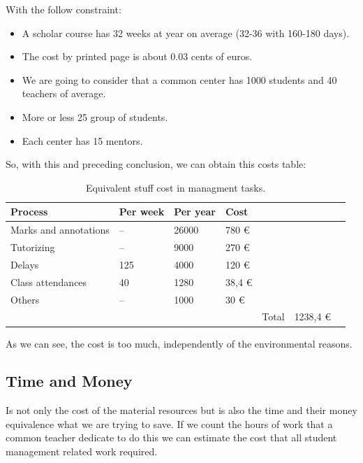 With the follow constraint:


\begin{itemize}
  \setlength{\itemsep}{0pt}
\item A scholar course has 32 weeks at year on average (32-36 with 160-180 days).
\item The cost by printed page is about 0.03 cents of euros.
\item We are going to consider that a common center has 1000 students and 40 teachers of average.
\item More or less 25 group of students.
\item Each center has 15 mentors.
\end{itemize}

So, with this and preceding conclusion, we can obtain this costs table:

\begin{table}[H]
\centering

\begin{tabular}{@{}lllllll@{}}

Process & Per week  & Per year  & Cost  \\
\midrule

Marks and annotations   &  --  &  26000  &   780      \euro  \\
Tutorizing              &  --  &  9000   &   270      \euro  \\
Delays                  &  125 &  4000   &   120      \euro  \\
Class attendances       &  40  &  1280   &   38,4     \euro  \\
Others                  &  --  &  1000   &   30       \euro  \\

\midrule
& & & & Total & 1238,4 \euro \\
\end{tabular}
\caption{Equivalent stuff cost in managment tasks. }
\label{my-label}
\end{table}


As we can see, the cost is too much, independently of the environmental reasons.

\subsection{Time and Money}

Is not only the cost of the material resources but is also the time and their money
equivalence what we are trying to save.  If we count the hours of work that a
common teacher dedicate to do this we can estimate the cost that all student
management related work required.

